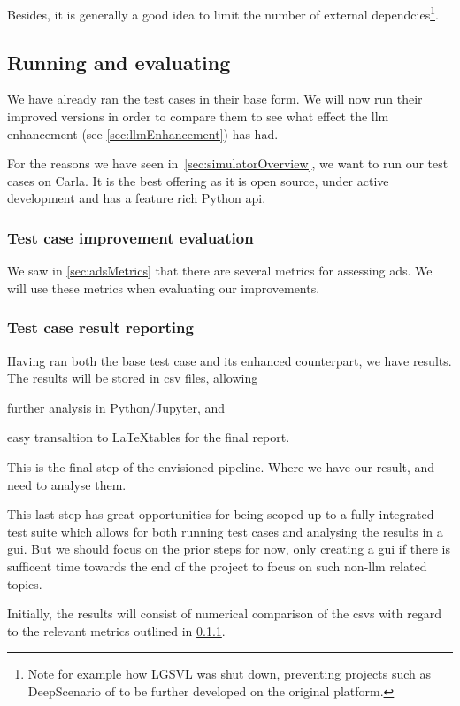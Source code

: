 Besides, it is generally a good idea to limit the number of external dependcies\footnote{
    Note for example how LGSVL\cite{lgsvl} was shut down, preventing projects such as
    DeepScenario of \citeauthor{DeepScenario} to be further developed on the
    original platform.}.

\subsection{Running and evaluating}

We have already ran the test cases in their base form. We will now run their
improved versions in order to compare them to see what effect the \acrshort{llm}
enhancement (see \cref{sec:llmEnhancement}) has had.

For the reasons we have seen in~\cref{sec:simulatorOverview}, we want to run our
test cases on Carla. It is the best offering as it is open source, under active
development and has a feature rich Python \acrshort{api}.

\subsubsection{Test case improvement evaluation}\label{sec:testCaseEval}

We saw in \cref{sec:adsMetrics} that there are several metrics for assessing
\acrshort{ads}. We will use these metrics when evaluating our improvements.

\subsubsection{Test case result reporting}

Having ran both the base test case and its enhanced counterpart, we have
results. The results will be stored in \acrfull{csv} files, allowing \begin{inparaenum}
    \item further analysis in Python/Jupyter,
    and
    \item easy transaltion to \LaTeX tables for the final report.
\end{inparaenum}

This is the final step of the envisioned pipeline. Where we have our result, and
need to analyse them.

This last step has great opportunities for being scoped up to a fully integrated
test suite which allows for both running test cases and analysing the results in
a \acrfull{gui}. But we should focus on the prior steps for now, only creating a
\acrshort{gui} if there is sufficent time towards the end of the project to
focus on such non-\acrshort{llm} related topics.

Initially, the results will consist of numerical comparison of the
\acrshort{csv}s with regard to the relevant metrics outlined in
\cref{sec:testCaseEval}.
